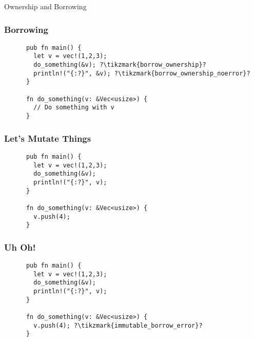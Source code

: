 \begin{section}{Ownership and Borrowing}
    \begin{frame}[fragile]
    \frametitle{Borrowing}
    \begin{verbatim}
      pub fn main() {
        let v = vec!(1,2,3);
        do_something(&v); ?\tikzmark{borrow_ownership}?
        println!("{:?}", &v); ?\tikzmark{borrow_ownership_noerror}?
      }

      fn do_something(v: &Vec<usize>) {
        // Do something with v
      }
    \end{verbatim}
  \end{frame}

  \begin{frame}[fragile]
    \frametitle{Let's Mutate Things}
    \begin{verbatim}
      pub fn main() {
        let v = vec!(1,2,3);
        do_something(&v);
        println!("{:?}", v);
      }

      fn do_something(v: &Vec<usize>) {
        v.push(4);
      }
    \end{verbatim}
  \end{frame}

  \begin{frame}[fragile]
    \frametitle{Uh Oh!}
    \begin{verbatim}
      pub fn main() {
        let v = vec!(1,2,3);
        do_something(&v);
        println!("{:?}", v);
      }

      fn do_something(v: &Vec<usize>) {
        v.push(4); ?\tikzmark{immutable_borrow_error}?
      }
    \end{verbatim}
  \end{frame}


\end{section}
